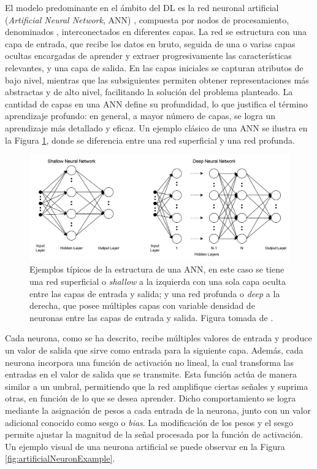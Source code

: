 El modelo predominante en el ámbito del DL es la red neuronal artificial (\textit{Artificial Neural Network}, ANN) \cite{bishop_ANN, ripley_ANN}, compuesta por nodos de procesamiento, denominados , interconectados en diferentes capas. La red se estructura con una capa de entrada, que recibe los datos en bruto, seguida de una o varias capas ocultas encargadas de aprender y extraer progresivamente las características relevantes, y una capa de salida. En las capas iniciales se capturan atributos de bajo nivel, mientras que las subsiguientes permiten obtener representaciones más abstractas y de alto nivel, facilitando la solución del problema planteado. La cantidad de capas en una ANN define su profundidad, lo que justifica el término aprendizaje profundo: en general, a mayor número de capas, se logra un aprendizaje más detallado y eficaz. Un ejemplo clásico de una ANN se ilustra en la Figura \ref{fig:annExample}, donde se diferencia entre una red superficial y una red profunda.

\begin{figure}[h]
    \centering
    \includegraphics[width=\linewidth]{figures/2_theory/neuralNetDiagram.png}
    \caption[Ejemplos de la estructura de una ANN]{Ejemplos típicos de la estructura de una ANN, en este caso se tiene una red superficial o \textit{shallow} a la izquierda con una sola capa oculta entre las capas de entrada y salida; y una red profunda o \textit{deep} a la derecha, que posee múltiples capas con variable densidad de neuronas entre las capas de entrada y salida. Figura tomada de \cite{annPictureSource}.}
    \label{fig:annExample}
\end{figure}

Cada neurona, como se ha descrito, recibe múltiples valores de entrada y produce un valor de salida que sirve como entrada para la siguiente capa. Además, cada neurona incorpora una función de activación no lineal, la cual transforma las entradas en el valor de salida que se transmite. Esta función actúa de manera similar a un umbral, permitiendo que la red amplifique ciertas señales y suprima otras, en función de lo que se desea aprender. Dicho comportamiento se logra mediante la asignación de pesos a cada entrada de la neurona, junto con un valor adicional conocido como sesgo o \textit{bias}. La modificación de los pesos y el sesgo permite ajustar la magnitud de la señal procesada por la función de activación. Un ejemplo visual de una neurona artificial se puede observar en la Figura \ref{fig:artificialNeuronExample}.

